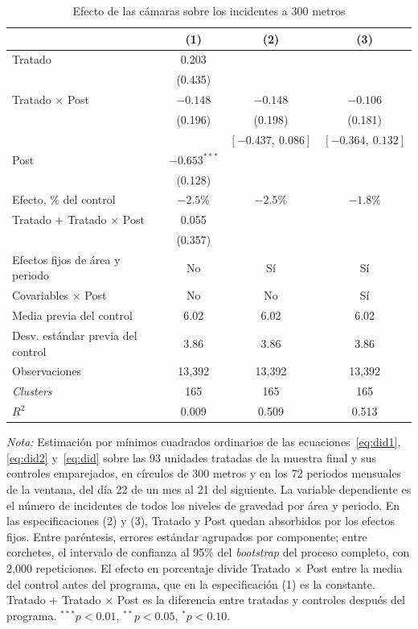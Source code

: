 \begin{table}[htbp]
    \centering
    \caption{Efecto de las cámaras sobre los incidentes a 300 metros}
    \label{tab:principal}
    \footnotesize
    \setlength{\tabcolsep}{4pt}
    \begin{tabular}{l c c c}
        \toprule
        & (1) & (2) & (3) \\
        \midrule
        Tratado & 0.203 & & \\
         & (0.435) & & \\
        Tratado $\times$ Post & $-0.148$ & $-0.148$ & $-0.106$ \\
         & (0.196) & (0.198) & (0.181) \\
         & & $[-0.437,\ 0.086]$ & $[-0.364,\ 0.132]$ \\
        Post & $-0.653^{***}$ & & \\
         & (0.128) & & \\
        \addlinespace
        Efecto, \% del control & $-2.5\%$ & $-2.5\%$ & $-1.8\%$ \\
        Tratado $+$ Tratado $\times$ Post & 0.055 & & \\
         & (0.357) & & \\
        \midrule
        Efectos fijos de área y periodo & No & Sí & Sí \\
        Covariables $\times$ Post & No & No & Sí \\
        Media previa del control & 6.02 & 6.02 & 6.02 \\
        Desv. estándar previa del control & 3.86 & 3.86 & 3.86 \\
        Observaciones & 13,392 & 13,392 & 13,392 \\
        \emph{Clusters} & 165 & 165 & 165 \\
        $R^2$ & 0.009 & 0.509 & 0.513 \\
        \bottomrule
    \end{tabular}
    \begin{minipage}{0.95\linewidth}\linespread{1}\selectfont
        \vspace{0.4em}
        \footnotesize \textit{Nota:} Estimación por mínimos cuadrados ordinarios de las ecuaciones~\eqref{eq:did1}, \eqref{eq:did2} y~\eqref{eq:did} sobre las 93 unidades tratadas de la muestra final y sus controles emparejados, en círculos de 300 metros y en los 72 periodos mensuales de la ventana, del día 22 de un mes al 21 del siguiente. La variable dependiente es el número de incidentes de todos los niveles de gravedad por área y periodo. En las especificaciones (2) y (3), Tratado y Post quedan absorbidos por los efectos fijos. Entre paréntesis, errores estándar agrupados por componente; entre corchetes, el intervalo de confianza al 95\% del \emph{bootstrap} del proceso completo, con 2,000 repeticiones. El efecto en porcentaje divide Tratado $\times$ Post entre la media del control antes del programa, que en la especificación (1) es la constante. Tratado $+$ Tratado $\times$ Post es la diferencia entre tratadas y controles después del programa. ${}^{***} p<0.01$, ${}^{**} p<0.05$, ${}^{*} p<0.10$.
    \end{minipage}
\end{table}

